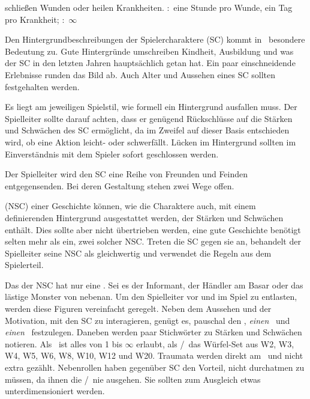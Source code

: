 \begin{multicols}{2}
 schließen Wunden oder heilen Krankheiten. \VZ:~eine Stunde pro Wunde, ein Tag pro Krankheit; \NWZ:~$\infty$


Den Hintergrundbeschreibungen der Spielercharaktere (SC) kommt in \nipajin\ besondere Bedeutung zu. Gute Hintergründe umschreiben Kindheit, Ausbildung und was der SC in den letzten Jahren hauptsächlich getan hat. Ein paar einschneidende Erlebnisse runden das Bild ab. Auch Alter und Aussehen eines SC sollten festgehalten werden. 

Es liegt am jeweiligen Spielstil, wie formell ein Hintergrund ausfallen muss. Der Spielleiter sollte darauf achten, dass er genügend Rückschlüsse auf die Stärken und Schwächen des SC ermöglicht, da im Zweifel auf dieser Basis entschieden wird, ob eine Aktion leicht- oder schwerfällt. Lücken im Hintergrund sollten im Einverständnis mit dem Spieler sofort geschlossen werden.


Der Spielleiter wird den SC eine Reihe von Freunden und Feinden entgegensenden. Bei deren Gestaltung stehen zwei Wege offen.

 (NSC) einer Geschichte können, wie die Charaktere auch, mit einem definierenden Hintergrund ausgestattet werden, der Stärken und Schwächen enthält. Dies sollte aber nicht übertrieben werden, eine gute Geschichte benötigt selten mehr als ein, zwei solcher NSC. Treten die SC gegen sie an, behandelt der Spielleiter seine NSC als gleichwertig und verwendet die Regeln aus dem Spielerteil. 

Das  der NSC hat nur eine . Sei es der Informant, der Händler am Basar oder das lästige Monster von nebenan. Um den Spielleiter vor und im Spiel zu entlasten, werden diese Figuren vereinfacht geregelt. Neben dem Aussehen und der Motivation, mit den SC zu interagieren, genügt es, pauschal den \WW, \emph{einen} \AW\ und \emph{einen} \RW\ festzulegen. Daneben werden paar Stichwörter zu Stärken und Schwächen notieren. Als \WW\ ist alles von 1 bis $\infty$ erlaubt, als \AW/\RW\ das Würfel-Set aus W2, W3, W4, W5, W6, W8, W10, W12 und W20. Traumata werden direkt am \WW\ und nicht extra gezählt. Nebenrollen haben gegenüber SC den Vorteil, nicht durchatmen zu müssen, da ihnen die \AW/\RW\ nie ausgehen. Sie sollten zum Ausgleich etwas unterdimensioniert werden. %


\end{multicols}
